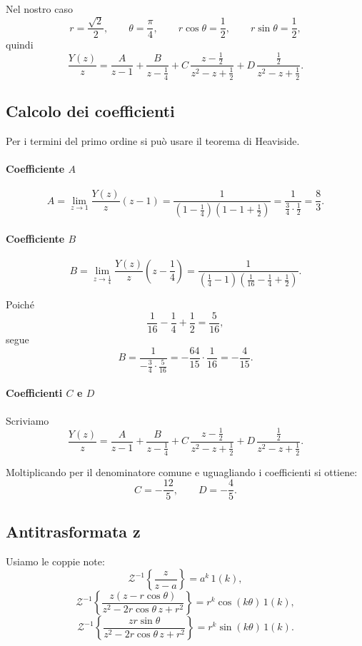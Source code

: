 Nel nostro caso
\[
r=\frac{\sqrt2}{2},
\qquad
\theta=\frac{\pi}{4},
\qquad
r\cos\theta=\frac12,
\qquad
r\sin\theta=\frac12,
\]
quindi
\[
\frac{Y(z)}{z}
=
\frac{A}{z-1}
+
\frac{B}{z-\frac14}
+
C\,\frac{z-\frac12}{z^2-z+\frac12}
+
D\,\frac{\frac12}{z^2-z+\frac12}.
\]

\subsection{Calcolo dei coefficienti}

Per i termini del primo ordine si può usare il teorema di Heaviside.

\paragraph{Coefficiente \(A\)}
\[
A=\lim_{z\to 1}\frac{Y(z)}{z}(z-1)
=
\frac{1}{\left(1-\frac14\right)\left(1-1+\frac12\right)}
=
\frac{1}{\frac34\cdot \frac12}
=
\frac{8}{3}.
\]

\paragraph{Coefficiente \(B\)}
\[
B=\lim_{z\to \frac14}\frac{Y(z)}{z}\left(z-\frac14\right)
=
\frac{1}{\left(\frac14-1\right)\left(\frac1{16}-\frac14+\frac12\right)}.
\]

Poiché
\[
\frac1{16}-\frac14+\frac12=\frac{5}{16},
\]
segue
\[
B
=
\frac{1}{-\frac34\cdot \frac5{16}}
=
-\frac{64}{15}
\cdot \frac{1}{16}
=
-\frac{4}{15}.
\]

\paragraph{Coefficienti \(C\) e \(D\)}

Scriviamo
\[
\frac{Y(z)}{z}
=
\frac{A}{z-1}
+
\frac{B}{z-\frac14}
+
C\,\frac{z-\frac12}{z^2-z+\frac12}
+
D\,\frac{\frac12}{z^2-z+\frac12}.
\]

Moltiplicando per il denominatore comune e uguagliando i coefficienti si ottiene:
\[
C=-\frac{12}{5},
\qquad
D=-\frac{4}{5}.
\]

\subsection{Antitrasformata z}

Usiamo le coppie note:
\[
\mathcal{Z}^{-1}\left\{\frac{z}{z-a}\right\}=a^k\,1(k),
\]
\[
\mathcal{Z}^{-1}\left\{
\frac{z(z-r\cos\theta)}{z^2-2r\cos\theta\,z+r^2}
\right\}
=
r^k\cos(k\theta)\,1(k),
\]
\[
\mathcal{Z}^{-1}\left\{
\frac{zr\sin\theta}{z^2-2r\cos\theta\,z+r^2}
\right\}
=
r^k\sin(k\theta)\,1(k).
\]

